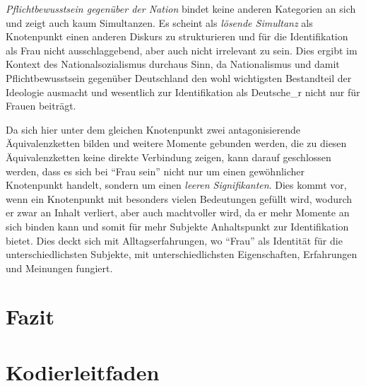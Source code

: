 \documentclass[12pt, titlepage=true, toc=bib]{scrartcl}
\begin{document}
\textit{Pflichtbewusstsein gegenüber der Nation} bindet keine anderen Kategorien an sich und zeigt auch kaum Simultanzen. Es scheint als \textit{lösende Simultanz} als Knotenpunkt einen anderen Diskurs zu strukturieren und für die Identifikation als Frau nicht ausschlaggebend, aber auch nicht irrelevant zu sein. Dies ergibt im Kontext des Nationalsozialismus durchaus Sinn, da Nationalismus und damit Pflichtbewusstsein gegenüber Deutschland den wohl wichtigsten Bestandteil der Ideologie ausmacht und wesentlich zur Identifikation als Deutsche\_r nicht nur für Frauen beiträgt.


Da sich hier unter dem gleichen Knotenpunkt zwei antagonisierende Äquivalenzketten bilden und weitere Momente gebunden werden, die zu diesen Äquivalenzketten keine direkte Verbindung zeigen, kann darauf geschlossen werden, dass es sich bei "`Frau sein"' nicht nur um einen gewöhnlicher Knotenpunkt handelt, sondern um einen \textit{leeren Signifikanten}. Dies kommt vor, wenn ein Knotenpunkt mit besonders vielen Bedeutungen gefüllt wird, wodurch er zwar an Inhalt verliert, aber auch machtvoller wird, da er mehr Momente an sich binden kann und somit für mehr Subjekte Anhaltspunkt zur Identifikation bietet. Dies deckt sich mit Alltagserfahrungen, wo "`Frau"' als Identität für die unterschiedlichsten Subjekte, mit unterschiedlichsten Eigenschaften, Erfahrungen und Meinungen fungiert.


\section{Fazit}



\newpage

\nocite{medici_faschistische_1941}
\nocite{a._v._s._kameradschaft_1936}
\nocite{maltzahn_deutsche_1936}
\nocite{reimer_glucklich_1941}
\nocite{scholtz-klink_frauen_1936}
\nocite{weinhandl_wie_1941}
\nocite{friewart_japanisches_1941}


\printbibheading[title=Literaturverzeichnis]
\printbibliography[heading=subbibliography, keyword={Quelle}, title={Quellen}]
\printbibliography[heading=subbibliography, notkeyword={Quelle}]
\newpage

\appendix

\addpart{\appendixname}

\section{Kodierleitfaden}
\end{document}
